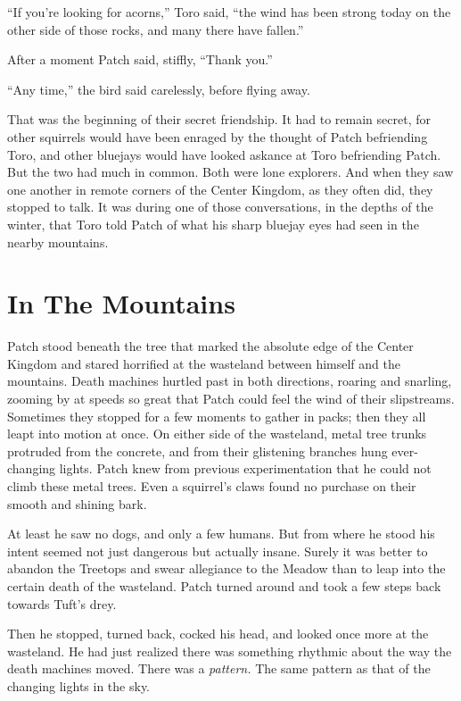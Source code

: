 \documentclass[ebook,oneside,openany,17pt]{memoir}
\newenvironment{tolerant}[1]{%
  \par\tolerance=#1\relax
}{%
  \par
}
\renewcommand{\thechapter}{\Roman{chapter}}
\newcounter{sections}
\newcommand{\sections}[1]{%
  \section*{#1}
  \addtocounter{sections}{1}%
  \pdfbookmark[1]{#1}{section.\thechapter.\thesections}}
\begin{document}
\begin{tolerant}{1000}
“If you’re looking for acorns,” Toro said, “the wind has been strong
today on the other side of those rocks, and many there have fallen.”
\end{tolerant}

After a moment Patch said, stiffly, “Thank you.”

“Any time,” the bird said carelessly, before flying away.

\begin{tolerant}{1000}
That was the beginning of their secret friendship. It had to remain
secret, for other squirrels would have been enraged by the thought of
Patch befriending Toro, and other bluejays would have looked askance
at Toro befriending Patch. But the two had much in common. Both were
lone explorers. And when they saw one another in remote corners of the
Center Kingdom, as they often did, they stopped to talk. It was during
one of those conversations, in the depths of the winter, that Toro
told Patch of what his sharp bluejay eyes had seen in the nearby
mountains.
\end{tolerant}


\sections{In The Mountains}

\begin{tolerant}{1000}
Patch stood beneath the tree that marked the absolute edge of the
Center Kingdom and stared horrified at the wasteland between himself
and the mountains. Death machines hurtled past in both directions,
roaring and snarling, zooming by at speeds so great that Patch could
feel the wind of their slipstreams. Sometimes they stopped for a few
moments to gather in packs; then they all leapt into motion at
once. On either side of the wasteland, metal tree trunks protruded
from the concrete, and from their glistening branches hung
ever-changing lights. Patch knew from previous experimentation that he
could not climb these metal trees. Even a squirrel’s claws found no
purchase on their smooth and shining bark.
\end{tolerant}

At least he saw no dogs, and only a few humans. But from where he
stood his intent seemed not just dangerous but actually insane. Surely
it was better to abandon the Treetops and swear allegiance to the
Meadow than to leap into the certain death of the wasteland. Patch
turned around and took a few steps back towards Tuft’s drey.

Then he stopped, turned back, cocked his head, and looked once more at
the wasteland. He had just realized there was something rhythmic about
the way the death machines moved. There was a \emph{pattern.} The
same pattern as that of the changing lights in the sky.
\end{document}

